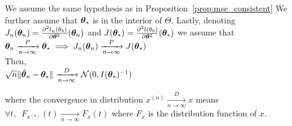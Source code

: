\begin{prop}
  \label{prop:asymp:norm}
  We assume the same hypothesis as in Proposition~\ref{prop:mse_consistent}
  We further assume that $\thetab_*$ is in the interior of $\Theta$.
  Lastly, denoting $J_n(\thetab_n) =
  \partialfrac{\thetab^2}{^2l_n(\theta_b)}(\thetab_n)$ and $J(\thetab_*) =
  \partialfrac{\thetab^2}{^2l(\theta_b)}(\thetab_*)$ we assume that \\
  $\thetab_n \xrightarrow[n \rightarrow
  \infty]{P} \thetab_* \implies J_n(\thetab_n) \xrightarrow[n \rightarrow
  \infty]{P} J(\thetab_*)$\\
  Then, \\
  $\sqrt{n} \| \hat{\thetab}_n - \thetab_* \| \xrightarrow[n \rightarrow
  \infty]{D}  \Ncal(0,
  I(\thetab_*)^{-1})$
\end{prop}
where the convergence in distribution $ x^{(n)} \xrightarrow[n \rightarrow \infty]{D} x$ means  $\forall t, \enspace F_{x^{(n)}}(t)
\xrightarrow[n \rightarrow \infty]{} F_x(t)$ where $F_x$ is the distribution
function of $x$.
